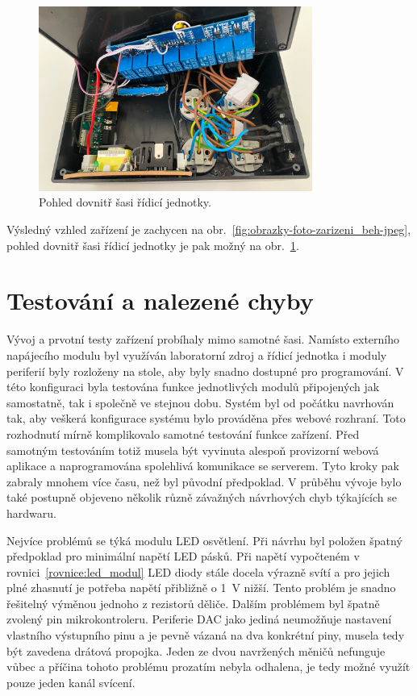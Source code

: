 \begin{figure}[h!]
    \centering
    \includegraphics[width=0.8\textwidth]{obrazky/foto/ulozeni.jpeg}
    \caption{Pohled dovnitř šasi řídicí jednotky.}
    \label{fig:obrazky-foto-ulozeni-jpeg}
\end{figure}


Výsledný vzhled zařízení je zachycen na obr.~\ref{fig:obrazky-foto-zarizeni_beh-jpeg}, pohled dovnitř šasi řídicí jednotky je pak možný na obr.~\ref{fig:obrazky-foto-ulozeni-jpeg}.

\section{Testování a nalezené chyby}
    Vývoj a prvotní testy zařízení probíhaly mimo samotné šasi. Namísto externího napájecího modulu byl využíván laboratorní zdroj a řídicí jednotka i moduly periferií byly rozloženy na stole, aby byly snadno dostupné pro programování. V této konfiguraci byla testována funkce jednotlivých modulů připojených jak samostatně, tak i společně ve stejnou dobu. Systém byl od počátku navrhován tak, aby veškerá konfigurace systému bylo prováděna přes webové rozhraní. Toto rozhodnutí mírně komplikovalo samotné testování funkce zařízení. Před samotným testováním totiž musela být vyvinuta alespoň provizorní webová aplikace a naprogramována spolehlivá komunikace se serverem. Tyto kroky pak zabraly mnohem více času, než byl původní předpoklad. V průběhu vývoje bylo také postupně objeveno několik různě závažných návrhových chyb týkajících se hardwaru. 
    
    Nejvíce problémů se týká modulu LED osvětlení. Při návrhu byl položen špatný předpoklad pro minimální napětí LED pásků. Při napětí vypočteném v rovnici~\ref{rovnice:led_modul} LED diody stále docela výrazně svítí a pro jejich plné zhasnutí je potřeba napětí přibližně o \qty{1}{V} nižší. Tento problém je snadno řešitelný výměnou jednoho z rezistorů děliče. Dalším problémem byl špatně zvolený pin mikrokontroleru. Periferie DAC jako jediná neumožňuje nastavení vlastního výstupního pinu a je pevně vázaná na dva konkrétní piny, musela tedy být zavedena drátová propojka. Jeden ze dvou navržených měničů nefunguje vůbec a příčina tohoto problému prozatím nebyla odhalena, je tedy možné využít pouze jeden kanál svícení. 

